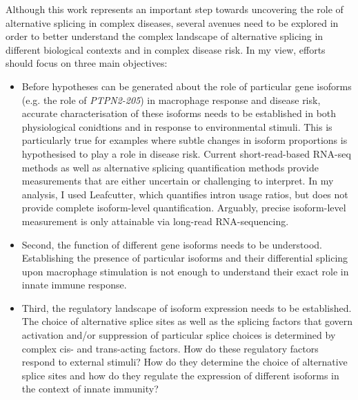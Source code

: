 Although this work represents an important step towards uncovering the role of alternative splicing in complex diseases, several avenues need to be explored in order to better understand the complex landscape of alternative splicing in different biological contexts and in complex disease risk. In my view, efforts should focus on three main objectives: 
\begin{itemize}
    \item Before hypotheses can be generated about the role of particular gene isoforms (e.g. the role of \textit{PTPN2-205}) in macrophage response and disease risk, accurate characterisation of these isoforms needs to be established in both physiological conidtions and in response to environmental stimuli. This is particularly true for examples where subtle changes in isoform proportions is hypothesised to play a role in disease risk. Current short-read-based RNA-seq methods as well as alternative splicing quantification methods provide measurements that are either uncertain or challenging to interpret. In my analysis, I used Leafcutter, which quantifies intron usage ratios, but does not provide complete isoform-level quantification. Arguably, precise isoform-level measurement is only attainable via long-read RNA-sequencing.
    \item Second, the function of different gene isoforms needs to be understood. Establishing the presence of particular isoforms and their differential splicing upon macrophage stimulation is not enough to understand their exact role in innate immune response. 
    \item Third, the regulatory landscape of isoform expression needs to be established. The choice of alternative splice sites as well as the splicing factors that govern activation and/or suppression of particular splice choices is determined by complex cis- and trans-acting factors. How do these regulatory factors respond to external stimuli? How do they determine the choice of alternative splice sites and how do they regulate the expression of different isoforms in the context of innate immunity? 
\end{itemize}

